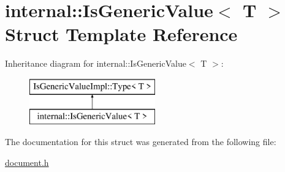 \hypertarget{a00184}{}\section{internal\+:\+:Is\+Generic\+Value$<$ T $>$ Struct Template Reference}
\label{a00184}
Inheritance diagram for internal\+:\+:Is\+Generic\+Value$<$ T $>$\+:\begin{figure}[H]
\begin{center}
\leavevmode
\includegraphics[height=2.000000cm]{a00184}
\end{center}
\end{figure}


The documentation for this struct was generated from the following file\+:\begin{DoxyCompactItemize}
\item 
\hyperlink{a00473}{document.\+h}\end{DoxyCompactItemize}
